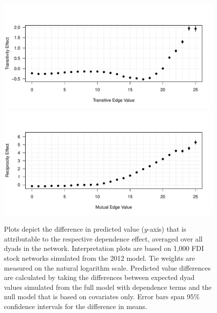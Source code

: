 \documentclass[reqno,onecolumn,letterpaper,12pt]{article}
\begin{document}
\begin{figure}[]
\centering
\includegraphics[scale=.75]{figures/transitiveInterpretation.pdf} \vspace{-.5cm}\\
\includegraphics[scale=.75]{figures/mutualInterpretation.pdf} \vspace{-.5cm}
\caption{\label{fig:interpret} Plots depict the difference in predicted value ($y$-axis) that is attributable to the respective dependence effect, averaged over all dyads in the network. Interpretation plots are based on 1,000 FDI stock networks simulated from the 2012 model. Tie weights are measured on the natural logarithm scale. Predicted value differences are calculated by taking the differences between expected dyad values simulated from the full model with dependence terms and the null model that is based on covariates only. Error bars span 95\% confidence intervals for the difference in means. }
\end{figure}
\end{document}

